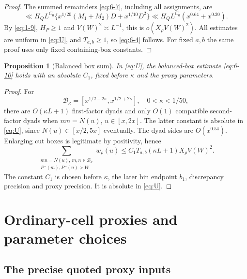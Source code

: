 \documentclass[11pt]{article}
\newtheorem{proposition}[theorem]{Proposition}
\theoremstyle{definition}
\theoremstyle{definition}
\begin{document}
\begin{proof}
The summed remainders \eqref{eq:6-7}, including all assignments, are
\begin{equation}
\ll H_Q L^{C_0}
 \{x^{1/20}(M_1+M_2)D+x^{1/10}D^2\}
 \ll H_Q L^{C_0}(x^{0.64}+x^{0.20}).                   \tag{6.9}\label{eq:6-9}
\end{equation}
By \eqref{eq:1-9}, \(H_P\ge1\) and \(V(W)^2\asymp L^{-1}\), this is
\(o(X_\rho V(W)^2)\). All estimates are uniform in \eqref{eq:U}, and \(T_{a,b}\ge1\), so \eqref{eq:6-4} follows. For fixed \(a,b\) the same proof uses only fixed containing-box constants. 

\end{proof}
\begin{proposition}[Balanced box sum]\label{prop:balanced}
In \eqref{eq:U}, the balanced-box estimate \eqref{eq:6-10} holds with an absolute \(C_1\), fixed before \(\kappa\) and the proxy parameters.
\end{proposition}
\begin{proof}
For
\begin{equation*}
\mathcal B_\kappa=[x^{1/2-2\kappa},x^{1/2+2\kappa}],
 \quad0<\kappa<1/50,
\end{equation*}
there are \(O(\kappa L+1)\) first-factor dyads and only \(O(1)\) compatible second-factor dyads when \(mn=N(u)\), \(u\in[x,2x]\). The latter constant is absolute in \eqref{eq:U}, since \(N(u)\in[x/2,5x]\) eventually. The dyad sides are \(O(x^{0.54})\). Enlarging cut boxes is legitimate by positivity, hence
\begin{equation}
\sum_{\substack{mn=N(u),\ m,n\in\mathcal B_\kappa\\
                         P^-(m),P^-(n)>W}}w_\rho(u)
 \le C_1T_{a,b}(\kappa L+1)X_\rho V(W)^2.                \tag{6.10}\label{eq:6-10}
\end{equation}
The constant \(C_1\) is chosen before \(\kappa\), the later bin endpoint \(b_1\), discrepancy precision and proxy precision. It is absolute in \eqref{eq:U}.



\end{proof}

\section{Ordinary-cell proxies and parameter choices}\label{sec:s7}

\subsection{The precise quoted proxy inputs}\label{sec:s7.1}
\end{document}
